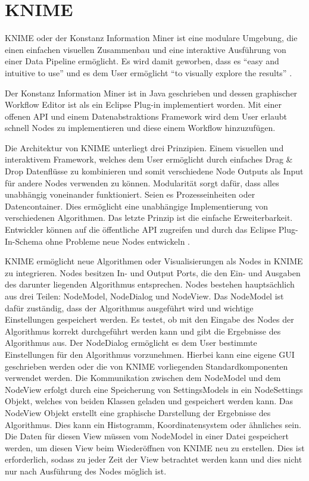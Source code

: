 {\section{KNIME}
\label{ch:Grundlagen:sec:knime}
KNIME oder der Konstanz Information Miner ist eine modulare Umgebung, die einen einfachen visuellen Zusammenbau und eine interaktive Ausführung von einer Data Pipeline ermöglicht. Es wird damit geworben, dass es \enquote{easy and intuitive to use} und es dem User ermöglicht \enquote{to visually explore the results} \cite[p. 2]{BCDG+07}.

Der Konstanz Information Miner ist in Java geschrieben und dessen graphischer Workflow Editor ist als ein Eclipse Plug-in implementiert worden. Mit einer offenen API und einem Datenabstraktions Framework wird dem User erlaubt schnell Nodes zu implementieren und diese einem Workflow hinzuzufügen.

Die Architektur von KNIME unterliegt drei Prinzipien. Einem visuellen und interaktivem Framework, welches dem User ermöglicht durch einfaches Drag \& Drop Datenflüsse zu kombinieren und somit verschiedene Node Outputs als Input für andere Nodes verwenden zu können. Modularität sorgt dafür, dass alles unabhängig voneinander funktioniert. Seien es Prozesseinheiten oder Datencontainer. Dies ermöglicht eine unabhängige Implementierung von verschiedenen Algorithmen. Das letzte Prinzip ist die einfache Erweiterbarkeit. Entwickler können auf die öffentliche API zugreifen und durch das Eclipse Plug-In-Schema ohne Probleme neue Nodes entwickeln \cite{BCDG+07}.

KNIME ermöglicht neue Algorithmen oder Visualisierungen als Nodes in KNIME zu integrieren. Nodes besitzen In- und Output Ports, die den Ein- und Ausgaben des darunter liegenden Algorithmus entsprechen. Nodes bestehen hauptsächlich aus drei Teilen: NodeModel, NodeDialog und NodeView. Das NodeModel ist dafür zuständig, dass der Algorithmus ausgeführt wird und wichtige Einstellungen gespeichert werden. Es testet, ob mit den Eingabe des Nodes der Algorithmus korrekt durchgeführt werden kann und gibt die Ergebnisse des Algorithmus aus. 
Der NodeDialog ermöglicht es dem User bestimmte Einstellungen für den Algorithmus vorzunehmen. Hierbei kann eine eigene GUI geschrieben werden oder die von KNIME vorliegenden Standardkomponenten verwendet werden. Die Kommunikation zwischen dem NodeModel und dem NodeView erfolgt durch eine Speicherung von SettingsModels in ein NodeSettings Objekt, welches von beiden Klassen geladen und gespeichert werden kann. 
Das NodeView Objekt erstellt eine graphische Darstellung der Ergebnisse des Algorithmus. Dies kann ein Histogramm, Koordinatensystem oder ähnliches sein. Die Daten für diesen View müssen vom NodeModel in einer Datei gespeichert werden, um diesen View beim Wiederöffnen von KNIME neu zu erstellen. Dies ist erforderlich, sodass zu jeder Zeit der View betrachtet werden kann und dies nicht nur nach Ausführung des Nodes möglich ist.

}
